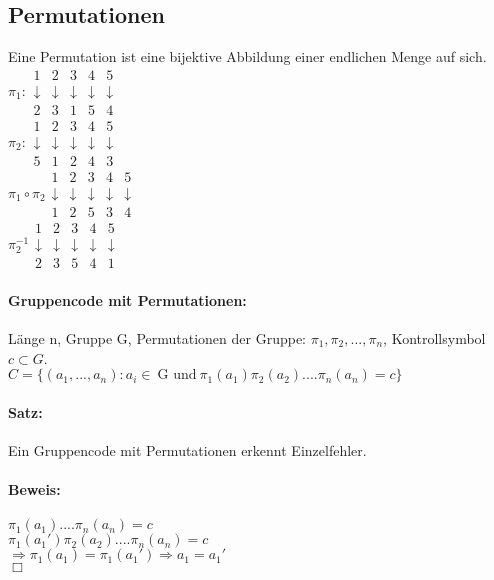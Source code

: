 \subsection{Permutationen}
Eine Permutation ist eine bijektive Abbildung einer endlichen Menge auf sich. 
$ \pi_1:  
\begin{array}{ccccc}
1 & 2 & 3 & 4 & 5 \\ 
 \downarrow  &  \downarrow  &  \downarrow  &  \downarrow  &  \downarrow  \\ 
2 & 3 & 1 & 5 & 4
\end{array} $
\\
$ \pi_2: 
\begin{array}{ccccc}
1 & 2 & 3 & 4 & 5 \\ 
\downarrow & \downarrow & \downarrow & \downarrow & \downarrow \\ 
5 & 1 & 2 & 4 & 3
\end{array} $
\\
$ \pi_1 \circ \pi_2
\begin{array}{ccccc}
1 & 2 & 3 & 4 & 5 \\ 
\downarrow & \downarrow & \downarrow & \downarrow & \downarrow \\ 
1 & 2 & 5 & 3 & 4
\end{array} $
\\
$ \pi_2^{-1} 
\begin{array}{ccccc}
1 & 2 & 3 & 4 & 5 \\ 
\downarrow & \downarrow & \downarrow & \downarrow & \downarrow \\ 
2 & 3 & 5 & 4 & 1
\end{array} $

\paragraph{Gruppencode mit Permutationen:} 
Länge n, Gruppe G, Permutationen der Gruppe: $ \pi_1,  \pi_2, ...,  \pi_n$, Kontrollsymbol $ c \subset G$.\\
$ C = \{(a_1, ..., a_n) \colon a_i \in \ \mbox{G und} \ \pi_1(a_1) \pi_2(a_2) ....  \pi_n(a_n) = c\}$

\paragraph{Satz:}
Ein Gruppencode mit Permutationen erkennt Einzelfehler. 

\paragraph{Beweis:}
$\pi_1(a_1) ....  \pi_n(a_n) = c$\\
$\pi_1(a_1')  \pi_2(a_2) ....  \pi_n(a_n) = c$\\
$\Rightarrow \pi_1(a_1) = \pi_1(a_1') \Rightarrow a_1 = a_1'$\\
$\Box$

